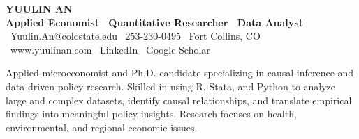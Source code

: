 \documentclass[9pt]{extarticle}
\begin{document}
\begin{center}
  {\fontsize{26}{28}\selectfont\bfseries YUULIN AN}\\[3pt]
  {\color{accent}\bfseries\large Applied Economist \textbar\ Quantitative Researcher \textbar\ Data Analyst}\\[4pt]
  {\small
    \faEnvelope\ Yuulin.An@colostate.edu \quad
    \faPhone\ 253-230-0495 \quad
    \faMapMarker\ Fort Collins, CO}\\[2pt]
  {\small
    \faGlobe\ www.yuulinan.com \quad
    \faLinkedin\ LinkedIn \quad
    \faGraduationCap\ Google Scholar}
\end{center}

\vspace{4pt}

\begin{tcolorbox}[colback=boxbg,colframe=borderc,boxrule=0.4pt,arc=2pt,
  left=10pt,right=10pt,top=8pt,bottom=8pt]
  \justifying\small
  Applied microeconomist and Ph.D. candidate specializing in causal
  inference and data-driven policy research. Skilled in using R,
  Stata, and Python to analyze large and complex datasets, identify
  causal relationships, and translate empirical findings into
  meaningful policy insights. Research focuses on health,
  environmental, and regional economic issues.
\end{tcolorbox}

\vspace{4pt}
\end{document}
